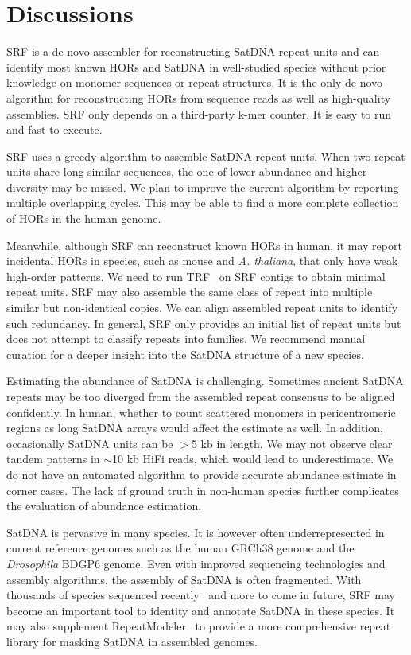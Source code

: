 \documentclass{bioinfo}
\newcommand{\revised}[1]{{\color{blue}#1}}
\begin{document}
\section{Discussions}

SRF is a de novo assembler for reconstructing SatDNA repeat units and can
identify most known HORs and SatDNA in well-studied species without prior
knowledge on monomer sequences or repeat structures. \revised{It is the only de novo
algorithm for reconstructing HORs from sequence reads as well as high-quality
assemblies.} SRF only depends on a third-party k-mer counter. It is easy to run
and fast to execute.

SRF uses a greedy algorithm to assemble SatDNA repeat units. When two repeat
units share long similar sequences, the one of lower abundance and higher
diversity may be missed. We plan to improve the current algorithm by reporting
multiple overlapping cycles. This may be able to find a more complete
collection of HORs in the human genome.

Meanwhile, although SRF can reconstruct known HORs in human, it may report
incidental HORs in species, such as mouse and \emph{A. thaliana}, that only
have weak high-order patterns. We need to run TRF~\citep{Benson:1999aa} on SRF
contigs to obtain minimal repeat units. SRF may also assemble the same class of
repeat into multiple similar but non-identical copies. We can align assembled
repeat units to identify such redundancy. \revised{In general, SRF only
provides an initial list of repeat units but does not attempt to classify
repeats into families. We recommend} manual curation for a deeper insight into
the SatDNA structure of a new species.

Estimating the abundance of SatDNA is challenging. Sometimes ancient SatDNA
repeats may be too diverged from the assembled repeat consensus to be aligned
confidently. In human, whether to count scattered monomers in pericentromeric
regions as long SatDNA arrays would affect the estimate as well. In addition,
occasionally SatDNA units can be $>$5 kb in length. We may not observe clear
tandem patterns in $\sim$10 kb HiFi reads, which would lead to underestimate.
We do not have an automated algorithm to provide accurate abundance estimate in
corner cases. \revised{The lack of ground truth in non-human species further
complicates the evaluation of abundance estimation.}

SatDNA is pervasive in many species. It is however often underrepresented in
current reference genomes such as the human GRCh38 genome and the
\emph{Drosophila} BDGP6 genome. Even with improved sequencing technologies and
assembly algorithms, the assembly of SatDNA is often fragmented. With thousands
of species sequenced recently~\citep{Challis:2020aa,Rhie:2021ug} and more to
come in future, SRF may become an important tool to identity and annotate
SatDNA in these species. It may also supplement
RepeatModeler~\citep{Flynn:2020aa} to provide a more comprehensive repeat
library for masking SatDNA in assembled genomes.
\end{document}
